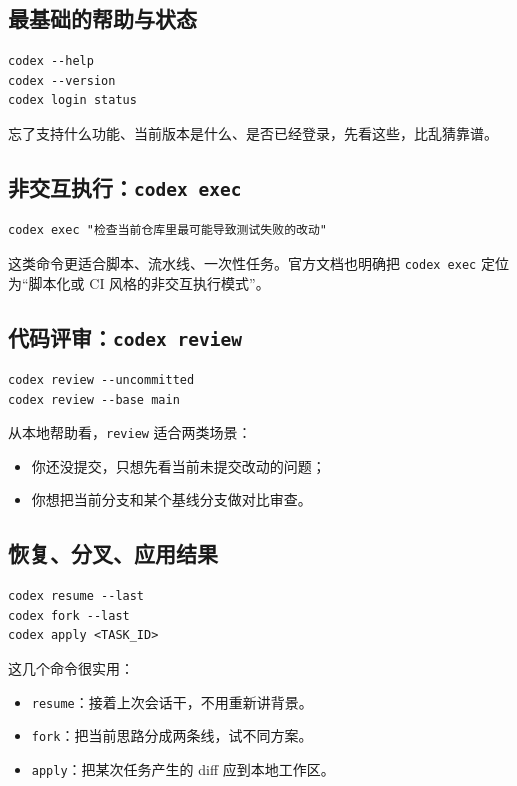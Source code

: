 \documentclass[UTF8,a4paper,12pt]{ctexart}
\begin{document}
\subsection{最基础的帮助与状态}

\begin{lstlisting}[style=cli]
codex --help
codex --version
codex login status
\end{lstlisting}

忘了支持什么功能、当前版本是什么、是否已经登录，先看这些，比乱猜靠谱。

\subsection{非交互执行：\texttt{codex exec}}

\begin{lstlisting}[style=cli]
codex exec "检查当前仓库里最可能导致测试失败的改动"
\end{lstlisting}

这类命令更适合脚本、流水线、一次性任务。官方文档也明确把 \texttt{codex exec} 定位为“脚本化或 CI 风格的非交互执行模式”。

\subsection{代码评审：\texttt{codex review}}

\begin{lstlisting}[style=cli]
codex review --uncommitted
codex review --base main
\end{lstlisting}

从本地帮助看，\texttt{review} 适合两类场景：
\begin{itemize}
  \item 你还没提交，只想先看当前未提交改动的问题；
  \item 你想把当前分支和某个基线分支做对比审查。
\end{itemize}

\subsection{恢复、分叉、应用结果}

\begin{lstlisting}[style=cli]
codex resume --last
codex fork --last
codex apply <TASK_ID>
\end{lstlisting}

这几个命令很实用：
\begin{itemize}
  \item \texttt{resume}：接着上次会话干，不用重新讲背景。
  \item \texttt{fork}：把当前思路分成两条线，试不同方案。
  \item \texttt{apply}：把某次任务产生的 diff 应到本地工作区。
\end{itemize}
\end{document}
